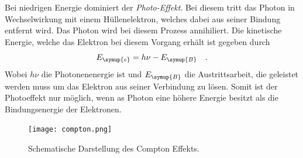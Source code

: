 Bei niedrigen Energie dominiert der \textit{Photo-Effekt}. Bei diesem tritt das Photon in Wechselwirkung mit einem Hüllenelektron, welches dabei aus seiner Bindung entfernt wird.
Das Photon wird bei diesem Prozess annihiliert. Die kinetische Energie, welche das Elektron bei diesem Vorgang erhält ist gegeben durch 
\begin{equation}
E_{\symup{e}}=h\nu-E_{\symup{B}}\quad .
\end{equation}
Wobei $h\nu$ die Photonenenergie ist und $E_{\symup{B}}$ die Austrittsarbeit, die geleistet werden muss um das Elektron aus seiner 
Verbindung zu lösen. Somit ist der Photoeffekt nur möglich, wenn as Photon eine höhere Energie besitzt als die Bindungsenergie der Elektronen.

\FloatBarrier
\begin{figure}[h]
    \centering
    \texttt{[image: compton.png]}
    \caption{Schematische Darstellung des Compton Effekts. \cite{quelle01}}
    \label{fig:tfig1}
\end{figure}
\FloatBarrier
\noindent

